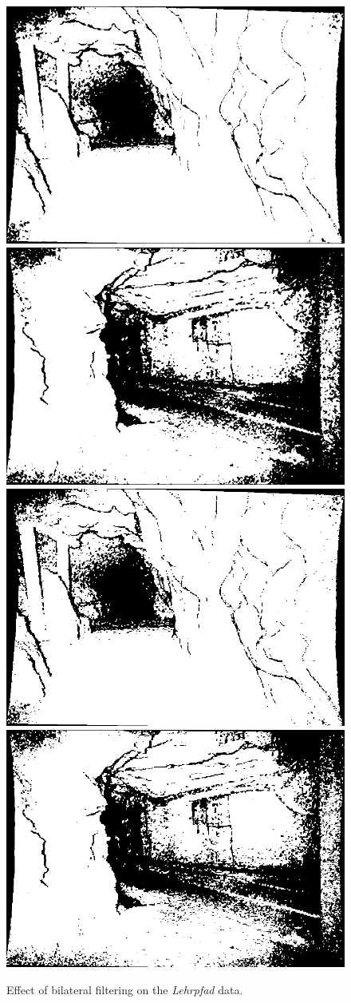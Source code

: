 \begin{figure}[H]
    \includegraphics[width=0.25\linewidth]{chapter06/results/conv_images/lehrpfad/flexion/bl/0000.png}%
    \includegraphics[width=0.25\linewidth]{chapter06/results/conv_images/lehrpfad/flexion/bl/0360.png}%
    \includegraphics[width=0.25\linewidth]{chapter06/results/conv_images/lehrpfad/bearing/bl/0000.png}%
    \includegraphics[width=0.25\linewidth]{chapter06/results/conv_images/lehrpfad/bearing/bl/0360.png}%
    \caption{Effect of bilateral filtering on the \emph{Lehrpfad} data.}
\end{figure}
